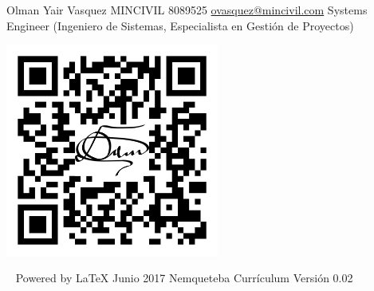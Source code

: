 \documentclass[overlapped,line,final]{res}
\begin{document}
\begin{resume}
Olman Yair Vasquez\newline
MINCIVIL 8089525\newline
\url{ovasquez@mincivil.com}\newline
Systems Engineer (Ingeniero de Sistemas, Especialista en Gestión de Proyectos)

\vspace{\fill}
\begin{minipage}{1.0\linewidth}
\begin{center}	
	\includegraphics[width=7cm,bb=0 0 1147 1147]{./qr.png}
\end{center}
\end{minipage}


\vspace{\fill}\ \newline
{\tiny \rm $ $Powered by \LaTeX $ $ }
{\tiny \rm $ $Junio 2017$ $ }
{\tiny \rm $ $Nemqueteba Currículum Versión 0.02 $ $ }

\end{resume}
\end{document}
